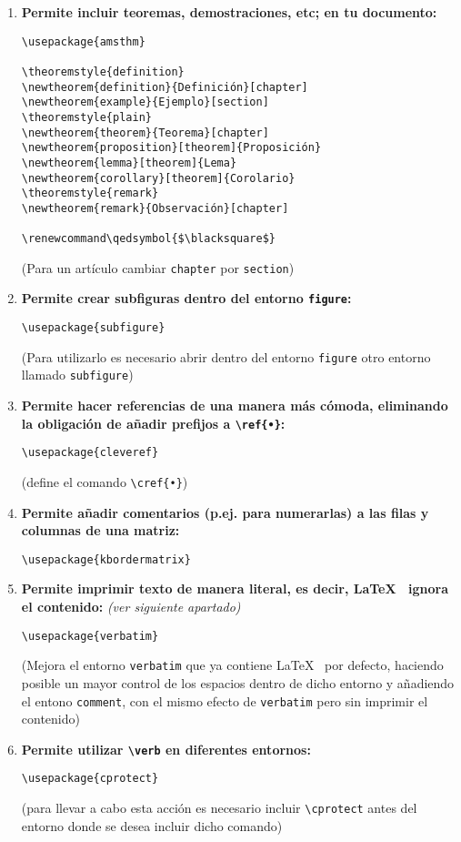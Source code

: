 \documentclass[11pt,a4paper]{article}
\begin{document}
\begin{enumerate}
\item \textbf{Permite incluir teoremas, demostraciones, etc; en tu documento:}
\begin{verbatim}
\usepackage{amsthm}

\theoremstyle{definition}
\newtheorem{definition}{Definición}[chapter]
\newtheorem{example}{Ejemplo}[section]
\theoremstyle{plain}
\newtheorem{theorem}{Teorema}[chapter]
\newtheorem{proposition}[theorem]{Proposición}
\newtheorem{lemma}[theorem]{Lema}
\newtheorem{corollary}[theorem]{Corolario}
\theoremstyle{remark}
\newtheorem{remark}{Observación}[chapter]

\renewcommand\qedsymbol{$\blacksquare$}
\end{verbatim}
(Para un artículo cambiar \verb|chapter| por \verb|section|)

\item \textbf{Permite crear subfiguras dentro del entorno \texttt{figure}:}
\begin{verbatim}
\usepackage{subfigure}
\end{verbatim}
(Para utilizarlo es necesario abrir dentro del entorno \texttt{figure} otro entorno llamado \texttt{subfigure})

\item \cprotect\textbf{Permite hacer referencias de una manera más cómoda, eliminando la obligación de añadir prefijos a \verb|\ref{•}|:}
\begin{verbatim}
\usepackage{cleveref}
\end{verbatim}
(define el comando \verb|\cref{•}|)

\item \textbf{Permite añadir comentarios (p.ej. para numerarlas) a las filas y columnas de una matriz:}
\begin{verbatim}
\usepackage{kbordermatrix}
\end{verbatim}

\item \textbf{Permite imprimir texto de manera literal, es decir, \LaTeX~ ignora el contenido:} \textit{(ver siguiente apartado)}
\begin{verbatim}
\usepackage{verbatim}
\end{verbatim}
(Mejora el entorno \verb|verbatim| que ya contiene \LaTeX~ por defecto, haciendo posible un mayor control de los espacios dentro de dicho entorno y añadiendo el entono \verb|comment|, con el mismo efecto de \verb|verbatim| pero sin imprimir el contenido)

\item \cprotect\textbf{Permite utilizar \verb|\verb| en diferentes entornos:}
\begin{verbatim}
\usepackage{cprotect}
\end{verbatim}
(para llevar a cabo esta acción es necesario incluir \verb|\cprotect| antes del entorno donde se desea incluir dicho comando)


\end{enumerate}
\end{document}
